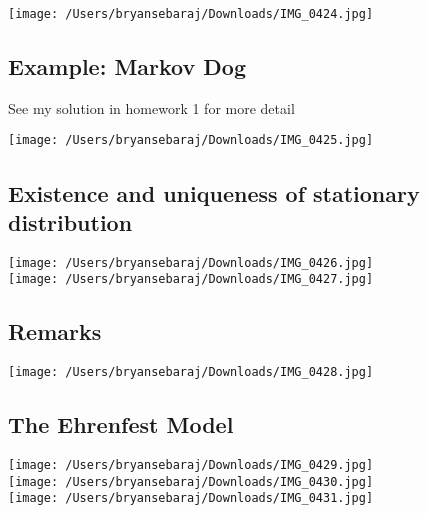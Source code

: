 \documentclass{article}
\begin{document}
\texttt{[image: /Users/bryansebaraj/Downloads/IMG\_0424.jpg]}

\subsection{Example: Markov Dog}

See my solution in homework 1 for more detail

\texttt{[image: /Users/bryansebaraj/Downloads/IMG\_0425.jpg]}

\subsection{Existence and uniqueness of stationary distribution}

\texttt{[image: /Users/bryansebaraj/Downloads/IMG\_0426.jpg]} \\ 

\texttt{[image: /Users/bryansebaraj/Downloads/IMG\_0427.jpg]}

\subsection{Remarks}

\texttt{[image: /Users/bryansebaraj/Downloads/IMG\_0428.jpg]}

\subsection{The Ehrenfest Model}

\texttt{[image: /Users/bryansebaraj/Downloads/IMG\_0429.jpg]} \\ 

\texttt{[image: /Users/bryansebaraj/Downloads/IMG\_0430.jpg]} \\ 

\texttt{[image: /Users/bryansebaraj/Downloads/IMG\_0431.jpg]}
\end{document}
